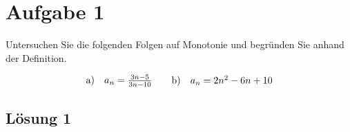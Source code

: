 \section*{Aufgabe 1}
Untersuchen Sie die folgenden Folgen auf Monotonie und begründen Sie anhand der Definition.

\begin{align*}
	\begin{array}{ c c }
		\text{a)} & a_{n} =\frac{3n-5}{3n-10}
	\end{array} & & \begin{array}{ c c }
		\text{b)} & a_{n} =2n^{2} -6n+10
	\end{array}
\end{align*}

\subsection*{Lösung 1}

